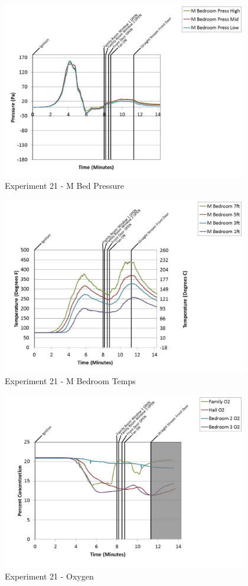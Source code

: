 \documentclass{article}
\begin{document}
\begin{appendices}
	\begin{figure}[h!]
		\centering
		\includegraphics[height=3.05in]{0_Images/Results_Charts/Exp_21_Charts/MBedPressure.pdf}
		\caption{Experiment 21 - M Bed Pressure}
	\end{figure}
 
	\clearpage

	\begin{figure}[h!]
		\centering
		\includegraphics[height=3.05in]{0_Images/Results_Charts/Exp_21_Charts/MBedroomTemps.pdf}
		\caption{Experiment 21 - M Bedroom Temps}
	\end{figure}
 

	\begin{figure}[h!]
		\centering
		\includegraphics[height=3.05in]{0_Images/Results_Charts/Exp_21_Charts/Oxygen.pdf}
		\caption{Experiment 21 - Oxygen}
	\end{figure}
 

\end{appendices}
\end{document}
